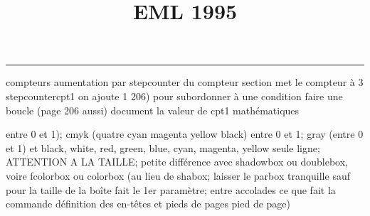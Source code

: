 \documentclass[11pt]{article}%
\title{\bf \vspace{-2cm} EML 1995} %
\author{} %
\date{} %
\renewcommand{\headrulewidth}{0pt}%
\renewcommand{\footrulewidth}{0.4pt}%
\begin{document}
\maketitle %
\vspace{-1.4cm}\hrule %
\thispagestyle{fancy}

\vspace*{.2cm}



compteurs%
aumentation par stepcounter du compteur section%
met le compteur à 3%
stepcounter{cpt1} on ajoute 1%
206) pour subordonner à une condition %
faire une boucle (page 206 aussi) %
document la valeur de cpt1 
mathématiques\newcommand{\ch}{\operatorname{ch}} 
\newcommand{\sh}{\operatorname{sh}}
\renewcommand{\tanh}{\operatorname{th}}
\renewcommand{\sinh}{\operatorname{sh}}
\renewcommand{\cosh}{\operatorname{ch}}
\newcommand{\argsh}{\operatorname{argsh}}
\newcommand{\argch}{\operatorname{argch}}
\newcommand{\argth}{\operatorname{argth}}
\newcommand{\ker}{\operatorname{Ker}}
\renewcommand{\im}{\operatorname{Im}}
\newcommand{\rg}{\operatorname{rg}}
\newcommand{\Id}{\operatorname{Id}}
\newcommand{\id}{\operatorname{id}}
\renewcommand{\leq}{\leq}
\renewcommand{\geq}{\geq }

entre 0 et 1); cmyk (quatre cyan magenta yellow black) entre 0 et 1;
gray (entre 0 et 1) et black, white, red, green, blue, cyan, magenta,
yellow%
seule ligne; ATTENTION A LA TAILLE; petite différence avec shadowbox ou
doublebox, voire fcolorbox ou colorbox (au lieu de shabox; laisser le
parbox tranquille sauf pour la taille de la boîte
\newcommand{\Tbox}[1]{\begin{center} \shabox{\parbox{0.6
\linewidth}{#1}} \end{center}} %
fait le 1er paramètre; entre accolades ce que fait la commande
définition des en-têtes et pieds de pages\pagestyle{fancy}
\chead{}
\rfoot[ \ \thepage]{\thepage}
\cfoot{}
\lfoot{}
\thispagestyle{fancy} %
pied de page)\renewcommand{\footrulewidth}{0.4pt}
\renewcommand{\headrulewidth}{0.4pt}
\end{document}
